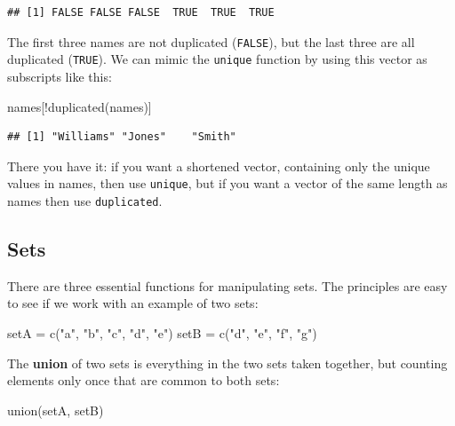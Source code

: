 \documentclass[
]{book}
\newenvironment{Shaded}{\begin{snugshade}}{\end{snugshade}}
\newcommand{\FunctionTok}[1]{\textcolor[rgb]{0.00,0.00,0.00}{#1}}
\newcommand{\NormalTok}[1]{#1}
\newcommand{\OtherTok}[1]{\textcolor[rgb]{0.56,0.35,0.01}{#1}}
\newcommand{\SpecialCharTok}[1]{\textcolor[rgb]{0.00,0.00,0.00}{#1}}
\newcommand{\StringTok}[1]{\textcolor[rgb]{0.31,0.60,0.02}{#1}}
\begin{document}
\begin{verbatim}
## [1] FALSE FALSE FALSE  TRUE  TRUE  TRUE
\end{verbatim}

The first three names are not duplicated (\texttt{FALSE}), but the last three are all duplicated (\texttt{TRUE}). We can mimic the \texttt{unique} function by using this vector as subscripts like this:

\begin{Shaded}
\begin{Highlighting}[]
\NormalTok{names[}\SpecialCharTok{!}\FunctionTok{duplicated}\NormalTok{(names)]}
\end{Highlighting}
\end{Shaded}

\begin{verbatim}
## [1] "Williams" "Jones"    "Smith"
\end{verbatim}

There you have it: if you want a shortened vector, containing only the unique values in names, then use \texttt{unique}, but if you want a vector of the same length as names then use \texttt{duplicated}.

\hypertarget{sets}{%
\subsection{Sets}\label{sets}}

There are three essential functions for manipulating sets. The principles are easy to see if we work with an example of two sets:

\begin{Shaded}
\begin{Highlighting}[]
\NormalTok{setA }\OtherTok{=} \FunctionTok{c}\NormalTok{(}\StringTok{"a"}\NormalTok{, }\StringTok{"b"}\NormalTok{, }\StringTok{"c"}\NormalTok{, }\StringTok{"d"}\NormalTok{, }\StringTok{"e"}\NormalTok{)}
\NormalTok{setB }\OtherTok{=} \FunctionTok{c}\NormalTok{(}\StringTok{"d"}\NormalTok{, }\StringTok{"e"}\NormalTok{, }\StringTok{"f"}\NormalTok{, }\StringTok{"g"}\NormalTok{)}
\end{Highlighting}
\end{Shaded}

The \textbf{union} of two sets is everything in the two sets taken together, but counting elements only once that are common to both sets:

\begin{Shaded}
\begin{Highlighting}[]
\FunctionTok{union}\NormalTok{(setA, setB)}
\end{Highlighting}
\end{Shaded}
\end{document}
